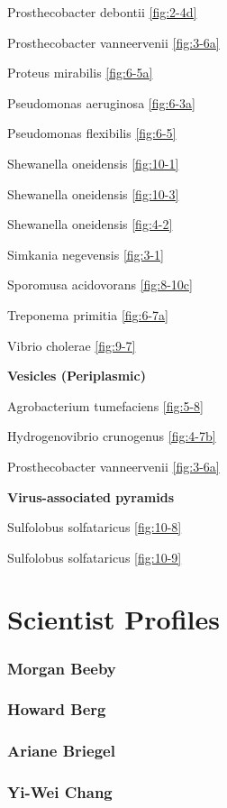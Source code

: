 \documentclass[]{tufte-book}
\begin{document}
Prosthecobacter debontii \ref{fig:2-4d}

Prosthecobacter vanneervenii \ref{fig:3-6a}

Proteus mirabilis \ref{fig:6-5a}

Pseudomonas aeruginosa \ref{fig:6-3a}

Pseudomonas flexibilis \ref{fig:6-5}

Shewanella oneidensis \ref{fig:10-1}

Shewanella oneidensis \ref{fig:10-3}

Shewanella oneidensis \ref{fig:4-2}

Simkania negevensis \ref{fig:3-1}

Sporomusa acidovorans \ref{fig:8-10c}

Treponema primitia \ref{fig:6-7a}

Vibrio cholerae \ref{fig:9-7}

\textbf{Vesicles (Periplasmic)}

Agrobacterium tumefaciens \ref{fig:5-8}

Hydrogenovibrio crunogenus \ref{fig:4-7b}

Prosthecobacter vanneervenii \ref{fig:3-6a}

\textbf{Virus-associated pyramids}

Sulfolobus solfataricus \ref{fig:10-8}

Sulfolobus solfataricus \ref{fig:10-9}

\chapter{Scientist Profiles}\label{scientist-profiles}

\hypertarget{morgan_beeby}{\subsection{Morgan
Beeby}\label{morgan_beeby}}

\hypertarget{howard_berg}{\subsection{Howard Berg}\label{howard_berg}}

\hypertarget{ariane_briegel}{\subsection{Ariane
Briegel}\label{ariane_briegel}}

\hypertarget{yi-wei_chang}{\subsection{Yi-Wei
Chang}\label{yi-wei_chang}}
\end{document}
